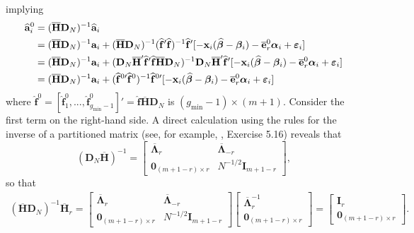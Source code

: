 \documentclass[12pt,fleqn]{article}
\def\*#1{\mathbf{#1}}
\def\+#1{\boldsymbol{#1}}
\begin{document}
implying
\begin{align}
\widehat{\*a}_i^0 & = (\overline{\*{H}}\*{D}_N)^{-1}\widehat{\*a}_i \notag\\
& = (\overline{\*{H}}\*{D}_N)^{-1}\*a_i + (\overline{\*{H}}\*{D}_N)^{-1}(\widehat{\*f}'\widehat{\*f})^{-1}\widehat{\*f}'[- \*x_{i}(\widehat{\+\beta}-\+\beta_i) - \overline{\*e}_{r}^0\+\alpha_i +  \+\varepsilon_{i} ] \notag\\
& = (\overline{\*{H}}\*{D}_N)^{-1}\*a_i +  (
\*{D}_N\overline{\*{H}}'\widehat{\*f}'\widehat{\*f}\overline{\*{H}}\*{D}_N)^{-1}\*{D}_N\overline{\*{H}}'\widehat{\*f}' [ - \*x_{i}(\widehat{\+\beta}-\+\beta_i)  - \overline{\*e}_{r}^0\+\alpha_i +  \+\varepsilon_{i}]
\notag\\
& = (\overline{\*{H}}\*{D}_N)^{-1}\*a_i + (\widehat{\*f}^{0\prime}\widehat{\*f}^0)^{-1}\widehat{\*f}^{0\prime}[- \*x_{i}(\widehat{\+\beta}-\+\beta_i)  - \overline{\*e}_{r}^0\+\alpha_i +  \+\varepsilon_{i} ]
\end{align}
where $\widehat{\*f}^0 = [\widehat{\*f}_1^0,...,\widehat{\*f}_{g_{\min}-1}^0]' = \widehat{\*f}\overline{\*{H}}\*{D}_N$ is $(g_{\min}-1)\times (m+1)$. Consider the first term on the right-hand side. A direct calculation using the rules for the inverse of a partitioned matrix (see, for example, \citet{abadir2005matrix}, Exercise 5.16) reveals that
\begin{equation}
    (\*{D}_N\overline{\*{H}})^{-1} =\left[\begin{array}{cc}\overline{\+{\Lambda}}_r & \overline{\+{\Lambda}}_{-r}\\
    \*{0}_{(m+1-r)\times r} & N^{-1/2}\*{I}_{m+1-r}\end{array}\right],
\end{equation}
so that
\begin{align}
(\overline{\*{H}}\*{D}_N)^{-1}\overline{\*H}_{r} = \left[\begin{array}{cc}\overline{\+{\Lambda}}_r & \overline{\+{\Lambda}}_{-r}\\
    \*{0}_{(m+1-r)\times r} & N^{-1/2}\*{I}_{m+1-r}\end{array}\right]\left[\begin{array}{c}\overline{\+{\Lambda}}_r^{-1} \\
    \*{0}_{(m+1-r)\times r} \end{array}\right] = \left[\begin{array}{c} \*I_r \\
    \*{0}_{(m+1-r)\times r} \end{array}\right].
\end{align}
\end{document}
